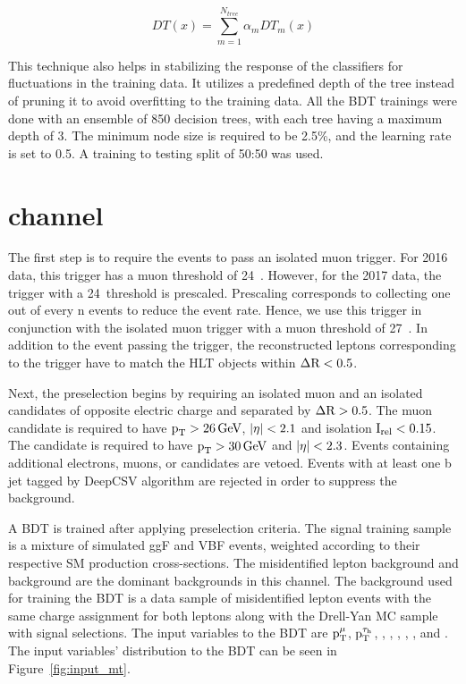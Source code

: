 \begin{equation}
DT(x)=\sum_{m=1}^{N_{tree}} \alpha_{m} DT_{m}(x)
\end{equation}

This technique also helps in stabilizing the response of the classifiers for fluctuations in the training data. It utilizes a predefined depth of the tree instead of pruning it to avoid overfitting to the training data. All the BDT trainings were done with an ensemble of 850 decision trees, with each tree having a maximum depth of 3. The minimum node size is required to be 2.5\%, and the learning rate is set to 0.5. A training to testing split of 50:50 was used.

\section{\texorpdfstring{\Hmuhad}{Hmutauh} channel}
The first step is to require the events to pass an isolated muon trigger. For 2016 data, this trigger has a muon \pt threshold of 24~\GeV. However, for the 2017 data, the trigger with a 24~\GeV threshold is prescaled. Prescaling corresponds to collecting one out of every n events to reduce the event rate. Hence, we use this trigger in conjunction with the isolated muon trigger with a muon \pt threshold of 27~\GeV. In addition to the event passing the trigger, the reconstructed leptons corresponding to the trigger have to match the HLT objects within $\Delta \text{R} < 0.5$.

Next, the preselection begins by requiring an isolated muon and an isolated \tauh candidates of opposite electric charge and separated by $\Delta \text{R} > 0.5$. The muon candidate is required to have $\text{p}_\text{T} > 26 \,\text{Ge\hspace{-.08em}V}$, $\lvert\eta\rvert < 2.1$ and isolation $\text{I}_\text{rel} < 0.15$. The \tauh candidate is required to have $\text{p}_\text{T} > 30 \,\text{Ge\hspace{-.08em}V}$ and $\lvert\eta\rvert < 2.3$. Events containing additional electrons, muons, or \tauh candidates are vetoed. Events with at least one b jet tagged by DeepCSV algorithm are rejected in order to suppress the \ttbar background.

A BDT is trained after applying preselection criteria. The signal training sample is a mixture of simulated ggF and VBF events, weighted according to their respective SM production cross-sections. The misidentified lepton background and \Ztt background are the dominant backgrounds in this channel. The background used for training the BDT is a data sample of misidentified lepton events with the same charge assignment for both leptons along with the Drell-Yan MC sample with signal selections. The input variables to the BDT are $\text{p}_\text{T}^{\mu}$, $\text{p}_\text{T}^{\tau_{\text{h}}}$, \mcol, \ptvecmiss, \mttmet, \detamtauh, \dphimtauh, and \dphitauhmet. The input variables' distribution to the BDT can be seen in Figure~\ref{fig:input_mt}.

